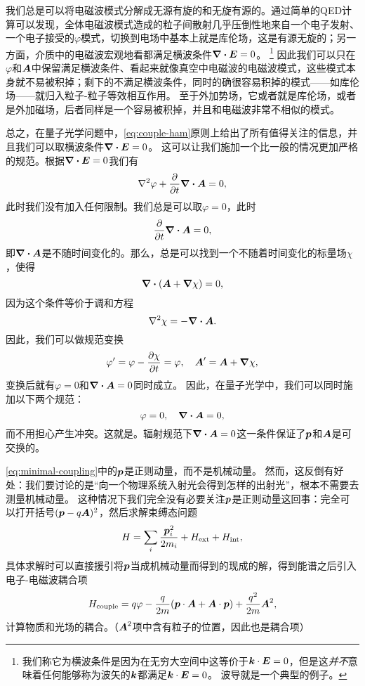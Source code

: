 我们总是可以将电磁波模式分解成无源有旋的和无旋有源的。通过简单的QED计算可以发现，全体电磁波模式造成的粒子间散射几乎压倒性地来自一个电子发射、一个电子接受的$\varphi$模式，切换到电场中基本上就是库伦场，这是有源无旋的；另一方面，介质中的电磁波宏观地看都满足横波条件$\div{\vb*{E}}=0$。%
\footnote{
    我们称它为横波条件是因为在无穷大空间中这等价于$\vb*{k} \cdot \vb*{E} = 0$，但是这\emph{并不}意味着任何能够称为波矢的$\vb*{k}$都满足$\vb*{k} \cdot \vb*{E} = 0$。
    波导就是一个典型的例子。
}%
因此我们可以只在$\varphi$和$\vb*{A}$中保留满足横波条件、看起来就像真空中电磁波的电磁波模式，这些模式本身就不易被积掉；剩下的不满足横波条件，同时的确很容易积掉的模式——如库伦场——就归入粒子-粒子等效相互作用。
至于外加势场，它或者就是库伦场，或者是外加磁场，后者同样是一个容易被积掉，并且和电磁波非常不相似的模式。

总之，在量子光学问题中，\eqref{eq:couple-ham}原则上给出了所有值得关注的信息，并且我们可以取横波条件$\div{\vb*{E}}=0$。
这可以让我们施加一个比一般的情况更加严格的规范。根据$\div{\vb*{E}}=0$我们有
\[
    \laplacian{\varphi} + \pdv{t} \div{\vb*{A}} = 0,
\]
此时我们没有加入任何限制。我们总是可以取$\varphi=0$，此时
\[
    \pdv{t} \div{\vb*{A}} = 0,
\]
即$\div{\vb*{A}}$是不随时间变化的。那么，总是可以找到一个不随着时间变化的标量场$\chi$，使得
\[
    \div{(\vb*{A} + \grad{\chi})} = 0,
\]
因为这个条件等价于调和方程
\[
    \laplacian{\chi} = - \div{\vb*{A}}.
\]
因此，我们可以做规范变换
\[
    \varphi' = \varphi - \pdv{\chi}{t} = \varphi, \quad \vb*{A}' = \vb*{A} + \grad{\chi},
\]
变换后就有$\varphi=0$和$\div{\vb*{A}}=0$同时成立。
因此，在量子光学中，我们可以同时施加以下两个规范：
\begin{equation}
    \varphi = 0, \quad \div{\vb*{A}} = 0,
\end{equation}
而不用担心产生冲突。这就是。辐射规范下$\div{\vb*{A}}=0$这一条件保证了$\vb*{p}$和$\vb*{A}$是可交换的。

\eqref{eq:minimal-coupling}中的$\vb*{p}$是正则动量，而不是机械动量。
然而，这反倒有好处：我们要讨论的是“向一个物理系统入射光会得到怎样的出射光”，根本不需要去测量机械动量。
这种情况下我们完全没有必要关注$\vb*{p}$是正则动量这回事：完全可以打开括号$(\vb*{p} - q \vb*{A})^2$，然后求解束缚态问题
\begin{equation}
    H = \sum_i \frac{\vb*{p}_i^2}{2m_i} + H_\text{ext} + H_\text{int},
    \label{eq:levels-ham}
\end{equation}
具体求解时可以直接援引将$\vb*{p}$当成机械动量而得到的现成的解，得到能谱之后引入电子-电磁波耦合项
\begin{equation}
    H_\text{couple} = q \varphi - \frac{q}{2m} (\vb*{p} \cdot \vb*{A} + \vb*{A} \cdot \vb*{p}) + \frac{q^2}{2m} \vb*{A}^2,
    \label{eq:couple-ham}
\end{equation}
计算物质和光场的耦合。（$\vb*{A}^2$项中含有粒子的位置，因此也是耦合项）

